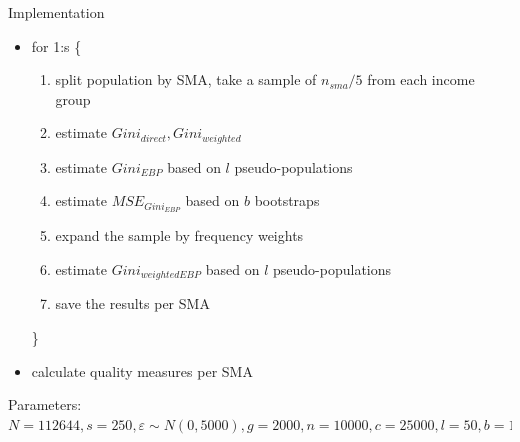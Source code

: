 \documentclass[fleqn,final]{beamer}
\newcommand{\Pheight}{\rule[-5mm]{0cm}{1cm}}
\begin{document}
\begin{frame}
\begin{columns}[t]
\begin{column}{.3\linewidth}
\begin{block}{Implementation \Pheight}
\begin{itemize}
\item for 1:s \{
\begin{enumerate}  %
\item split population by SMA, take a sample of $n_{sma} / 5$ from each income group
\item estimate $Gini_{direct}, Gini_{weighted}$
\item estimate $Gini_{EBP}$  based on $l$ pseudo-populations
\item estimate $MSE_{Gini_{EBP}}$ based on $b$ bootstraps
\item expand the sample by frequency weights
\item estimate $Gini_{weighted EBP}$  based on $l$ pseudo-populations
\item save the results per SMA
\end{enumerate}
\}
 
\item calculate quality measures per SMA 
 \end{itemize}
Parameters: $N=112644, s=250, \varepsilon \sim N(0,5000), g=2000, n=10000, c=25000, l=50, b=10, SMA=District$
\end{block}



\end{column}


%
%
  
\end{columns}  



\begin{columns}[t]

%


\begin{column}{.3\linewidth}


\end{column}
\end{columns}
\end{frame}
\end{document}
